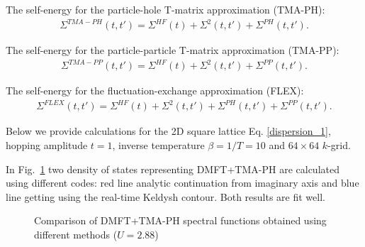 The self-energy for the particle-hole T-matrix approximation (TMA-PH):
\begin{align}
\label{Stma_ph_single_band}
\Sigma^{TMA-PH}(t,t')=\Sigma^{HF}(t)+\Sigma^{2}(t,t')+\Sigma^{PH}(t,t').
\end{align}

The self-energy for the particle-particle T-matrix approximation (TMA-PP):
\begin{align}
\label{Stma_pp_single_band}
\Sigma^{TMA-PP}(t,t')=\Sigma^{HF}(t)+\Sigma^{2}(t,t')+\Sigma^{PP}(t,t').
\end{align}

The self-energy for the fluctuation-exchange approximation (FLEX):
\begin{align}
\label{Sflex_single_band}
\Sigma^{FLEX}(t,t')=\Sigma^{HF}(t)+\Sigma^{2}(t,t')+\Sigma^{PH}(t,t')+\Sigma^{PP}(t,t').
\end{align}

Below we provide calculations for the 2D square lattice Eq. \eqref{dispersion_1}, hopping amplitude $t=1$, inverse temperature $\beta=1/T=10$ and $64 \times 64$ $k$-grid. 

In Fig.~\ref{Eq_comp_DOS} two density of states representing DMFT+TMA-PH are calculated using different codes: red line analytic continuation from imaginary axis and blue line getting using the real-time Keldysh contour. Both results are fit well. 
\begin{figure}[h!]
\caption{Comparison of DMFT+TMA-PH spectral functions obtained using different methods ($U=2.88$)}
\label{Eq_comp_DOS}
\end{figure}

